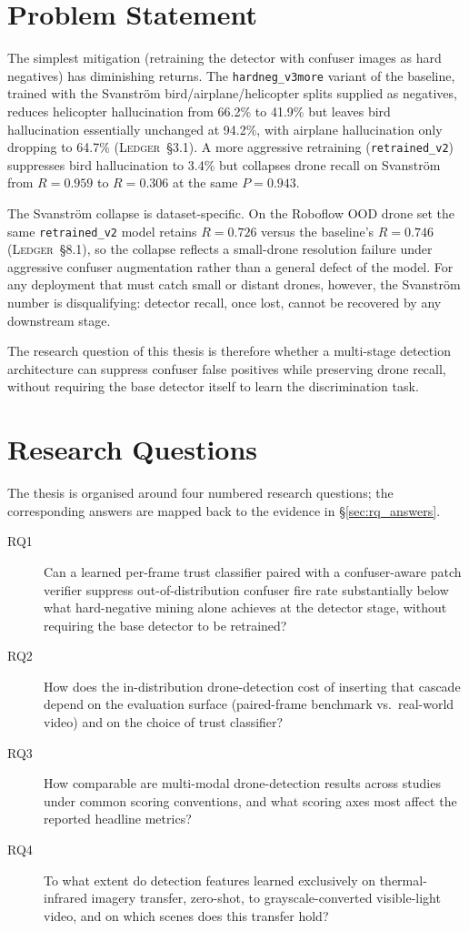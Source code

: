 \documentclass[12pt,a4paper,oneside,openright]{book}
\begin{document}
\section{Problem Statement}

The simplest mitigation (retraining the detector with confuser images as hard negatives) has diminishing returns. The \texttt{hardneg\_v3more} variant of the baseline, trained with the Svanstr\"om bird/airplane/helicopter splits supplied as negatives, reduces helicopter hallucination from 66.2\% to 41.9\% but leaves bird hallucination essentially unchanged at 94.2\%, with airplane hallucination only dropping to 64.7\% (\textsc{Ledger}~\S3.1). A more aggressive retraining (\texttt{retrained\_v2}) suppresses bird hallucination to 3.4\% but collapses drone recall on Svanstr\"om from $R=0.959$ to $R=0.306$ at the same $P=0.943$.

The Svanstr\"om collapse is dataset-specific. On the Roboflow OOD drone set the same \texttt{retrained\_v2} model retains $R=0.726$ versus the baseline's $R=0.746$ (\textsc{Ledger}~\S8.1), so the collapse reflects a small-drone resolution failure under aggressive confuser augmentation rather than a general defect of the model. For any deployment that must catch small or distant drones, however, the Svanstr\"om number is disqualifying: detector recall, once lost, cannot be recovered by any downstream stage.

The research question of this thesis is therefore whether a multi-stage detection architecture can suppress confuser false positives while preserving drone recall, without requiring the base detector itself to learn the discrimination task.

\section{Research Questions}
\label{sec:rqs}

The thesis is organised around four numbered research questions; the corresponding answers are mapped back to the evidence in \S\ref{sec:rq_answers}.

\begin{description}
    \item[RQ1] Can a learned per-frame trust classifier paired with a confuser-aware patch verifier suppress out-of-distribution confuser fire rate substantially below what hard-negative mining alone achieves at the detector stage, without requiring the base detector to be retrained?
    \item[RQ2] How does the in-distribution drone-detection cost of inserting that cascade depend on the evaluation surface (paired-frame benchmark vs.\ real-world video) and on the choice of trust classifier?
    \item[RQ3] How comparable are multi-modal drone-detection results across studies under common scoring conventions, and what scoring axes most affect the reported headline metrics?
    \item[RQ4] To what extent do detection features learned exclusively on thermal-infrared imagery transfer, zero-shot, to grayscale-converted visible-light video, and on which scenes does this transfer hold?
\end{description}
\end{document}

